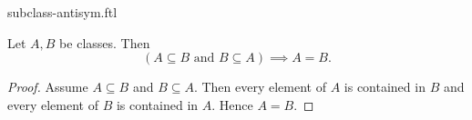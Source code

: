 \documentclass{stex}
\begin{document}
\begin{smodule}{subclass-antisym.ftl}

  \begin{forthel}
  \end{forthel}

  \begin{forthel}
    \begin{proposition}
      Let $A, B$ be classes.
      Then \[ (\text{$A \subseteq B$ and $B \subseteq A$}) \implies A = B. \]
    \end{proposition}
    \begin{proof}
      Assume $A \subseteq B$ and $B \subseteq A$.
      Then every element of $A$ is contained in $B$ and every element of $B$ is contained in $A$.
      Hence $A = B$.
    \end{proof}
  \end{forthel}
\end{smodule}
\end{document}
